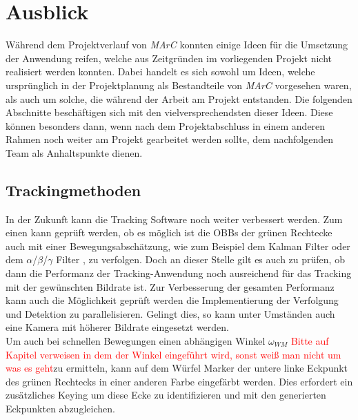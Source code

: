 \section{Ausblick}\label{sec:ausblick}
Während dem Projektverlauf von \emph{MArC} konnten einige Ideen für die Umsetzung der Anwendung reifen, welche aus Zeitgründen im vorliegenden Projekt nicht realisiert werden konnten. Dabei handelt es sich sowohl um Ideen, welche ursprünglich in der Projektplanung als Bestandteile von \emph{MArC} vorgesehen waren, als auch um solche, die während der Arbeit am Projekt entstanden. Die folgenden Abschnitte beschäftigen sich mit den vielversprechendsten dieser Ideen. Diese können besonders dann, wenn nach dem Projektabschluss in einem anderen Rahmen noch weiter am Projekt gearbeitet werden sollte, dem nachfolgenden Team als Anhaltspunkte dienen.
\subsection{Trackingmethoden}
In der Zukunft kann die Tracking Software noch weiter verbessert werden. Zum einen kann geprüft werden, ob es möglich ist die OBBs der grünen Rechtecke auch mit einer Bewegungsabschätzung, wie zum Beispiel dem Kalman Filter \cite{article:Kalman} oder dem $\alpha$/$\beta$/$\gamma$ Filter \cite{article:alphabetagamma}, zu verfolgen. Doch an dieser Stelle gilt es auch zu prüfen, ob dann die Performanz der Tracking-Anwendung noch ausreichend für das Tracking mit der gewünschten Bildrate ist. Zur Verbesserung der gesamten Performanz kann auch die Möglichkeit geprüft werden die Implementierung der Verfolgung und Detektion zu parallelisieren. Gelingt dies, so kann unter Umständen auch eine Kamera mit höherer Bildrate eingesetzt werden.\\
Um auch bei schnellen Bewegungen einen abhängigen Winkel $\omega_{WM}$ \textcolor{red}{Bitte auf Kapitel verweisen in dem der Winkel eingeführt wird, sonst weiß man nicht um was es geht}zu ermitteln, kann auf dem Würfel Marker der untere linke Eckpunkt des grünen Rechtecks in einer anderen Farbe eingefärbt werden. Dies erfordert ein zusätzliches Keying um diese Ecke zu identifizieren und mit den generierten Eckpunkten abzugleichen.


